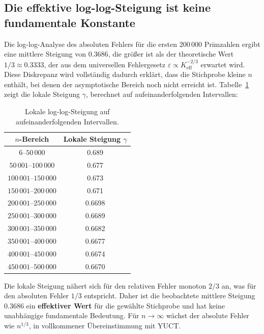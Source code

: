 \documentclass[11pt,a4paper]{article}
\begin{document}
	\subsection{Die effektive log-log-Steigung ist keine fundamentale Konstante}
	Die log-log-Analyse des absoluten Fehlers für die ersten \(200\,000\) Primzahlen ergibt eine mittlere Steigung von \(0.3686\), die größer ist als der theoretische Wert \(1/3 \approx 0.3333\), der aus dem universellen Fehlergesetz \(\varepsilon \propto K_{\mathrm{eff}}^{-2/3}\) erwartet wird. Diese Diskrepanz wird vollständig dadurch erklärt, dass die Stichprobe kleine \(n\) enthält, bei denen der asymptotische Bereich noch nicht erreicht ist. Tabelle~\ref{tab:local-slopes} zeigt die lokale Steigung \(\gamma\), berechnet auf aufeinanderfolgenden Intervallen:
	\begin{table}[htbp]
		\centering
		\caption{Lokale log-log-Steigung auf aufeinanderfolgenden Intervallen.}
		\label{tab:local-slopes}
		\begin{tabular}{c c}
			\toprule
			\(n\)-Bereich & Lokale Steigung \(\gamma\) \\
			\midrule
			\(6\)--\(50\,000\)    & 0.689 \\
			\(50\,001\)--\(100\,000\) & 0.677 \\
			\(100\,001\)--\(150\,000\)& 0.673 \\
			\(150\,001\)--\(200\,000\)& 0.671 \\
			\(200\,001\)--\(250\,000\)& 0.6698 \\
			\(250\,001\)--\(300\,000\)& 0.6689 \\
			\(300\,001\)--\(350\,000\)& 0.6682 \\
			\(350\,001\)--\(400\,000\)& 0.6677 \\
			\(400\,001\)--\(450\,000\)& 0.6674 \\
			\(450\,001\)--\(500\,000\)& 0.6670 \\
			\bottomrule
		\end{tabular}
	\end{table}
	Die lokale Steigung nähert sich für den relativen Fehler monoton \(2/3\) an, was für den absoluten Fehler \(1/3\) entspricht. Daher ist die beobachtete mittlere Steigung \(0.3686\) ein \textbf{effektiver Wert} für die gewählte Stichprobe und hat keine unabhängige fundamentale Bedeutung. Für \(n\to\infty\) wächst der absolute Fehler wie \(n^{1/3}\), in vollkommener Übereinstimmung mit YUCT.
	
\end{document}

